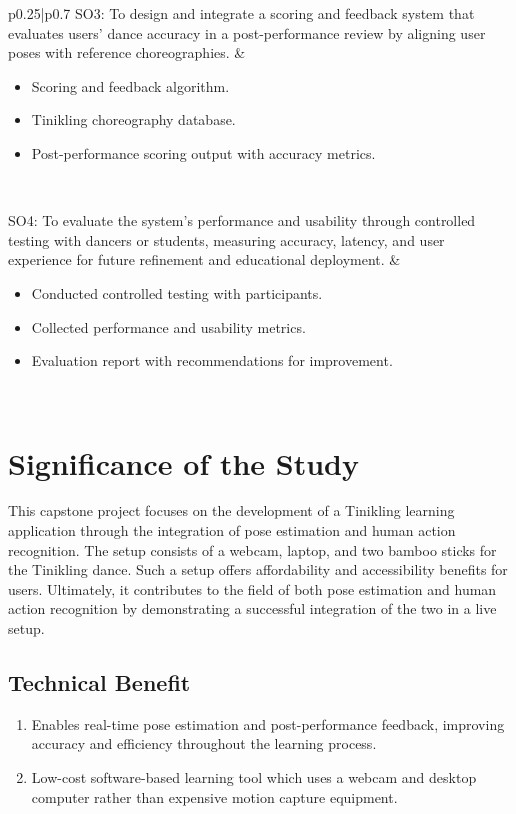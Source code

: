 \begin{table}[!htbp]
\begin{tabular}{p{0.25\textwidth}|p{0.7\textwidth}}
SO3: To design and integrate a scoring and feedback system that evaluates users’ dance accuracy in a post-performance review by aligning user poses with reference choreographies. &
\begin{minipage}[t]{\linewidth}
  \begin{itemize}
    \item Scoring and feedback algorithm.
    \item Tinikling choreography database.
    \item Post-performance scoring output with accuracy metrics.
  \end{itemize}
\end{minipage} \\ 
\hline

SO4: To evaluate the system’s performance and usability through controlled testing with dancers or students, measuring accuracy, latency, and user experience for future refinement and educational deployment. &
\begin{minipage}[t]{\linewidth}
  \begin{itemize}
    \item Conducted controlled testing with participants.
    \item Collected performance and usability metrics.
    \item Evaluation report with recommendations for improvement.
  \end{itemize}
\end{minipage} \\ 
\hline
\end{tabular}
\end{table}


\section{Significance of the Study}
This capstone project focuses on the development of a Tinikling learning application through the integration of pose estimation and human action recognition. The setup consists of a webcam, laptop, and two bamboo sticks for the Tinikling dance. Such a setup offers affordability and accessibility benefits for users. Ultimately, it contributes to the field of both pose estimation and human action recognition by demonstrating a successful integration of the two in a live setup.

\subsection{Technical Benefit}
\begin{enumerate}
\item Enables real-time pose estimation and post-performance feedback, improving accuracy and efficiency throughout the learning process. 
\item Low-cost software-based learning tool which uses a webcam and desktop computer rather than expensive motion capture equipment.
\end{enumerate}

